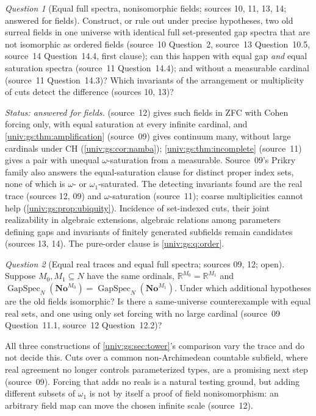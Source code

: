 \documentclass[11pt,letterpaper]{article}
\numberwithin{equation}{section}
\theoremstyle{definition}
\theoremstyle{remark}
\newtheorem{question}[question]{Question}
\newcommand{\No}{\mathbf{No}}
\newcommand{\R}{\mathbb R}
\newcommand{\GapSpec}{\operatorname{GapSpec}}
\begin{document}
\begin{question}[Equal full spectra, nonisomorphic fields; sources 10, 11, 13, 14; answered for fields]\label{univ:gs:q:equalspectra}
Construct, or rule out under precise hypotheses, two old surreal fields in one universe with
identical full set-presented gap spectra that are not isomorphic as ordered fields (source~10
Question~2, source~13 Question~10.5, source~14 Question~14.4, first clause); can this happen
with equal gap \emph{and} equal saturation spectra (source~11 Question~14.4); and without a
measurable cardinal (source~11 Question~14.3)? Which invariants of the arrangement or
multiplicity of cuts detect the difference (sources 10, 13)?
\end{question}
\emph{Status: answered for fields.}  (source~12) gives such fields in
ZFC with Cohen forcing only, with equal saturation at every infinite cardinal, and
\cref{univ:gs:thm:amplification} (source~09) gives continuum many, without large cardinals under
CH (\cref{univ:gs:cor:namba}); \cref{univ:gs:thm:incomplete} (source~11) gives a pair with unequal
$\omega$-saturation from a measurable. Source~09's Prikry family also answers the
equal-saturation clause for distinct proper index sets, none of which is $\omega$- or
$\omega_1$-saturated. The detecting invariants found are the real trace (sources 12, 09) and
$\omega$-saturation (source~11); coarse multiplicities cannot help
(\cref{univ:gs:prop:ubiquity}). Incidence of set-indexed cuts, their joint realizability in
algebraic extensions, algebraic relations among parameters defining gaps and invariants of
finitely generated subfields remain candidates (sources 13, 14). The pure-order clause is
\cref{univ:gs:q:order}.

\begin{question}[Equal real traces and equal full spectra; sources 09, 12; open]\label{univ:gs:q:trace}
Suppose $M_0,M_1\subseteq N$ have the same ordinals, $\R^{M_0}=\R^{M_1}$ and
$\GapSpec_N(\No^{M_0})=\GapSpec_N(\No^{M_1})$. Under which additional hypotheses are the old
fields isomorphic? Is there a same-universe counterexample with equal real sets, and one using
only set forcing with no large cardinal (source~09 Question~11.1, source~12 Question~12.2)?
\end{question}
All three constructions of \cref{univ:gs:sec:tower}'s comparison vary the trace and do not decide
this. Cuts over a common non-Archimedean countable subfield, where real agreement no longer
controls parameterized types, are a promising next step (source~09). Forcing that adds no reals
is a natural testing ground, but adding different subsets of $\omega_1$ is not by itself a proof
of field nonisomorphism: an arbitrary field map can move the chosen infinite scale (source~12).
\end{document}
